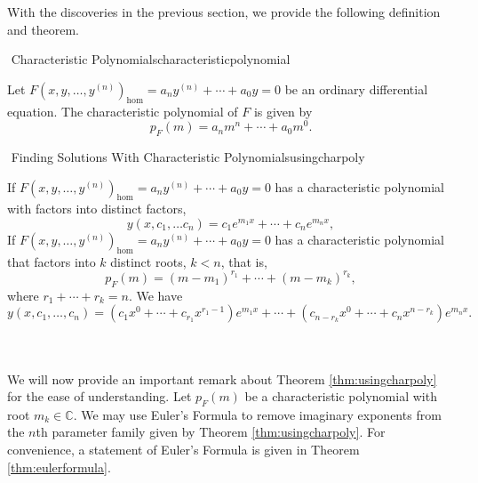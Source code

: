         With the discoveries in the previous section, we provide the following definition and theorem.
        \begin{definition}{\Stop\,\,Characteristic Polynomials}{characteristicpolynomial}

            Let \(F(x,y,\ldots,y^{(n)})_{\text{hom}}=a_ny^{(n)}+\cdots+a_0y=0\) be an ordinary differential equation. The characteristic polynomial of \(F\) is given by
            \begin{equation*}
                p_F(m)=a_nm^n+\cdots+a_0m^0.
            \end{equation*}
            
        \end{definition}
        \begin{theorem}{\Stop\,\,Finding Solutions With Characteristic Polynomials}{usingcharpoly}

            If \(F(x,y,\ldots,y^{(n)})_{\text{hom}}=a_ny^{(n)}+\cdots+a_0y=0\) has a characteristic polynomial with factors into distinct factors,
            \begin{equation*}
                y(x,c_1,\ldots c_n)=c_1e^{m_1x}+\cdots+c_ne^{m_nx},
            \end{equation*}
            If \(F(x,y,\ldots,y^{(n)})_{\text{hom}}=a_ny^{(n)}+\cdots+a_0y=0\) has a characteristic polynomial that factors into \(k\) distinct roots, \(k<n\), that is,
            \begin{equation*}
                p_F(m)=(m-m_1)^{r_1}+\cdots+(m-m_k)^{r_k},
            \end{equation*}
            where \(r_1+\cdots+r_k=n\). We have
            \begin{equation*}
                y(x,c_1,\ldots,c_n)=(c_1x^0+\cdots+c_{r_1}x^{r_1-1})e^{m_1x}+\cdots+(c_{n-r_k}x^0+\cdots+c_nx^{n-r_k})e^{m_nx}.
            \end{equation*}
            
        \end{theorem}
        \vphantom
        \\
        \\
        We will now provide an important remark about Theorem \ref{thm:usingcharpoly} for the ease of understanding. Let \(p_F(m)\) be a characteristic polynomial with root \(m_k\in\mathbb{C}\). We may use Euler's Formula to remove imaginary exponents from the \(n\)th parameter family given by Theorem \ref{thm:usingcharpoly}. For convenience, a statement of Euler's Formula is given in Theorem \ref{thm:eulerformula}.
